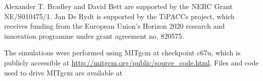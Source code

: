 \documentclass[draft]{agujournal2019}
\begin{document}
%
%

%

%




%
%
%
%
%
%
%
%


\acknowledgments
Alexander T. Bradley and David Bett are supported by the NERC Grant NE/S010475/1. Jan De Rydt is supported by the TiPACCs project, which receives funding from the European Union's Horizon 2020 research and innovation programme under grant agreement no. 820575. 

The simulations were performed using MITgcm at checkpoint c67u, which is publicly accessible at \url{http://mitgcm.org/public/source_code.html}. Files and code used to drive MITgcm are available at 
\end{document}
